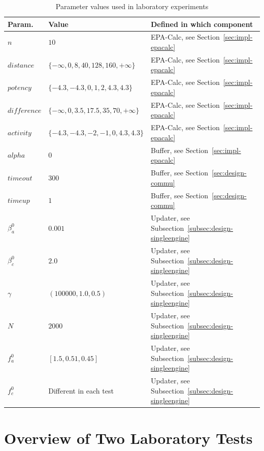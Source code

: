 %
\begin{table}
\centering
\caption{Parameter values used in laboratory experiments}
\label{table:param-setting}
\begin{tabular}{| l | l | l |}
\hline
\textbf{Param.} & \textbf{Value} & \textbf{Defined in which component} \\ \hline
$n$ & $10$ & EPA-Calc, see Section~\ref{sec:impl-epacalc} \\ \hline
$distance$ & $\{-\infty, 0, 8, 40, 128, 160, +\infty\}$ & EPA-Calc, see Section~\ref{sec:impl-epacalc} \\ \hline
$potency$ & $\{-4.3, -4.3, 0, 1, 2, 4.3, 4.3\}$ & EPA-Calc, see Section~\ref{sec:impl-epacalc}  \\ \hline 
$difference$ & $\{-\infty, 0, 3.5, 17.5, 35, 70, +\infty\}$ & EPA-Calc, see Section~\ref{sec:impl-epacalc}  \\ \hline
$activity$ & $\{-4.3, -4.3, -2, -1, 0, 4.3, 4.3\}$ & EPA-Calc, see Section~\ref{sec:impl-epacalc}  \\ \hline
$alpha$ & $0$ & Buffer, see Section~\ref{sec:impl-epacalc}  \\ \hline
$timeout$ & $300$ & Buffer, see Section~\ref{sec:design-commu} \\ \hline
$timeup$ & $1$ & Buffer, see Section~\ref{sec:design-commu} \\ \hline
$\beta_{a}^{0}$ & $0.001$ & Updater, see Subsection~\ref{subsec:design-singleengine} \\ \hline
$\beta_{c}^{0}$ & $2.0$ & Updater, see Subsection~\ref{subsec:design-singleengine} \\ \hline
$\gamma$ & $(100000, 1.0, 0.5)$ & Updater, see Subsection~\ref{subsec:design-singleengine} \\ \hline
$N$ & $2000$ & Updater, see Subsection~\ref{subsec:design-singleengine} \\ \hline
$f_a^{0}$ & $[1.5, 0.51, 0.45]$ & Updater, see Subsection~\ref{subsec:design-singleengine} \\ \hline
$f_c^{0}$ & Different in each test &Updater, see Subsection~\ref{subsec:design-singleengine} \\ \hline
\end{tabular}
\end{table}

\section{Overview of Two Laboratory Tests}


